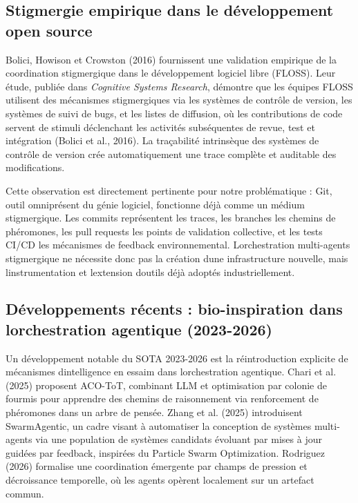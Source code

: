 \documentclass[12pt,a4paper]{article}
\begin{document}
\subsection{Stigmergie empirique dans le développement open
source}\label{stigmergie-empirique-dans-le-duxe9veloppement-open-source}

Bolici, Howison et Crowston (2016) fournissent une validation empirique
de la coordination stigmergique dans le développement logiciel libre
(FLOSS). Leur étude, publiée dans \emph{Cognitive Systems Research},
démontre que les équipes FLOSS utilisent des mécanismes stigmergiques
via les systèmes de contrôle de version, les systèmes de suivi de bugs,
et les listes de diffusion, où les contributions de code servent de
stimuli déclenchant les activités subséquentes de revue, test et
intégration (Bolici et al., 2016). La traçabilité intrinsèque des
systèmes de contrôle de version crée automatiquement une trace complète
et auditable des modifications.

Cette observation est directement pertinente pour notre problématique :
Git, outil omniprésent du génie logiciel, fonctionne déjà comme un
médium stigmergique. Les commits représentent les traces, les branches
les chemins de phéromones, les pull requests les points de validation
collective, et les tests CI/CD les mécanismes de feedback
environnemental. L\textquotesingle orchestration multi-agents
stigmergique ne nécessite donc pas la création d\textquotesingle une
infrastructure nouvelle, mais l\textquotesingle instrumentation et
l\textquotesingle extension d\textquotesingle outils déjà adoptés
industriellement.

\subsection{Développements récents : bio-inspiration dans
l\textquotesingle orchestration agentique
(2023-2026)}\label{duxe9veloppements-ruxe9cents--bio-inspiration-dans-lorchestration-agentique-2023-2026}

Un développement notable du SOTA 2023-2026 est la réintroduction
explicite de mécanismes d\textquotesingle intelligence en essaim dans
l\textquotesingle orchestration agentique. Chari et al. (2025) proposent
ACO-ToT, combinant LLM et optimisation par colonie de fourmis pour
apprendre des chemins de raisonnement via renforcement de phéromones
dans un arbre de pensée. Zhang et al. (2025) introduisent SwarmAgentic,
un cadre visant à automatiser la conception de systèmes multi-agents via
une population de systèmes candidats évoluant par mises à jour guidées
par feedback, inspirées du Particle Swarm Optimization. Rodriguez (2026)
formalise une coordination émergente par champs de pression et
décroissance temporelle, où les agents opèrent localement sur un
artefact commun.
\end{document}
